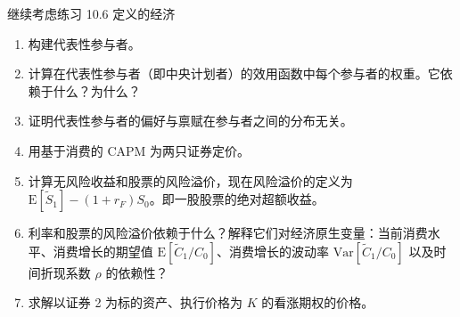 \begin{problem}
 继续考虑练习 10.6 定义的经济
\begin{enumerate}[label=(\alph*)]
    \item 构建代表性参与者。
    \item 计算在代表性参与者（即中央计划者）的效用函数中每个参与者的权重。它依赖于什么？为什么？
    \item 证明代表性参与者的偏好与禀赋在参与者之间的分布无关。
    \item 用基于消费的 CAPM 为两只证券定价。
    \item 计算无风险收益和股票的风险溢价，现在风险溢价的定义为 $\mathrm{E}[\tilde{S}_{1}]-(1+r_{F})S_{0}$。即一股股票的绝对超额收益。
    \item 利率和股票的风险溢价依赖于什么？解释它们对经济原生变量：当前消费水平、消费增长的期望值 $\mathrm{E}[\tilde{C}_{1}/C_{0}]$、消费增长的波动率 $\mathrm{Var}[\tilde{C}_{1}/C_{0}]$ 以及时间折现系数 $\rho$ 的依赖性？
    \item 求解以证券 2 为标的资产、执行价格为 $K$ 的看涨期权的价格。
\end{enumerate}
\end{problem}
